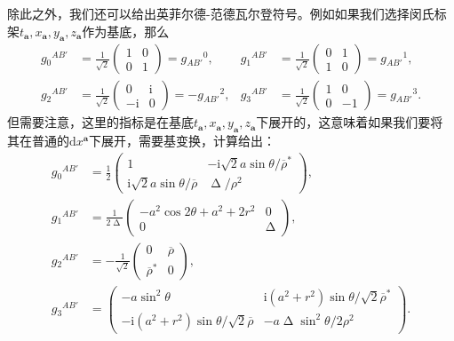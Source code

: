 除此之外，我们还可以给出英菲尔德-范德瓦尔登符号。例如如果我们选择闵氏标架$t_{\boldsymbol{a}} ,x_{\boldsymbol{a}} ,y_{\boldsymbol{a}} ,z_{\boldsymbol{a}}$作为基底，那么
\begin{equation*}
	\begin{aligned}
		g{_{0}}^{AB'} & =\frac{1}{\sqrt{2}}\begin{pmatrix}
			1 & 0\\
			0 & 1
		\end{pmatrix} =g{_{AB'}}^{0} , & g{_{1}}^{AB'} & =\frac{1}{\sqrt{2}}\begin{pmatrix}
			0 & 1\\
			1 & 0
		\end{pmatrix} =g{_{AB'}}^{1} ,\\
		g{_{2}}^{AB'} & =\frac{1}{\sqrt{2}}\begin{pmatrix}
			0 & \mathrm{i}\\
			-\mathrm{i} & 0
		\end{pmatrix} =-g{_{AB'}}^{2} , & g{_{3}}^{AB'} & =\frac{1}{\sqrt{2}}\begin{pmatrix}
			1 & 0\\
			0 & -1
		\end{pmatrix} =g{_{AB'}}^{3} .
	\end{aligned}
\end{equation*}
但需要注意，这里的指标是在基底$t_{\boldsymbol{a}} ,x_{\boldsymbol{a}} ,y_{\boldsymbol{a}} ,z_{\boldsymbol{a}}$下展开的，这意味着如果我们要将其在普通的$\mathrm{d} x^{\boldsymbol{a}}$下展开，需要基变换，计算给出：
\begin{equation*}
	\begin{aligned}
		g{_{0}}^{AB'} & =\frac{1}{2}\begin{pmatrix}
			1 & -\mathrm{i}\sqrt{2} a\sin \theta /\overline{\rho }^{*}\\
			\mathrm{i}\sqrt{2} a\sin \theta /\overline{\rho } & \upDelta /\rho ^{2}
		\end{pmatrix} ,\\
		g{_{1}}^{AB'} & =\frac{1}{2\upDelta }\begin{pmatrix}
			-a^{2}\cos 2\theta +a^{2} +2r^{2} & 0\\
			0 & \upDelta 
		\end{pmatrix} ,\\
		g{_{2}}^{AB'} & =-\frac{1}{\sqrt{2}}\begin{pmatrix}
			0 & \overline{\rho }\\
			\overline{\rho }^{*} & 0
		\end{pmatrix} ,\\
		g{_{3}}^{AB'} & =\begin{pmatrix}
			-a\sin^{2} \theta  & \mathrm{i} (a^{2} +r^{2} )\sin \theta /\sqrt{2}\overline{\rho }^{*}\\
			-\mathrm{i} (a^{2} +r^{2} )\sin \theta /\sqrt{2}\overline{\rho } & -a\upDelta \sin^{2} \theta /2\rho ^{2}
		\end{pmatrix} .
	\end{aligned}
\end{equation*}
